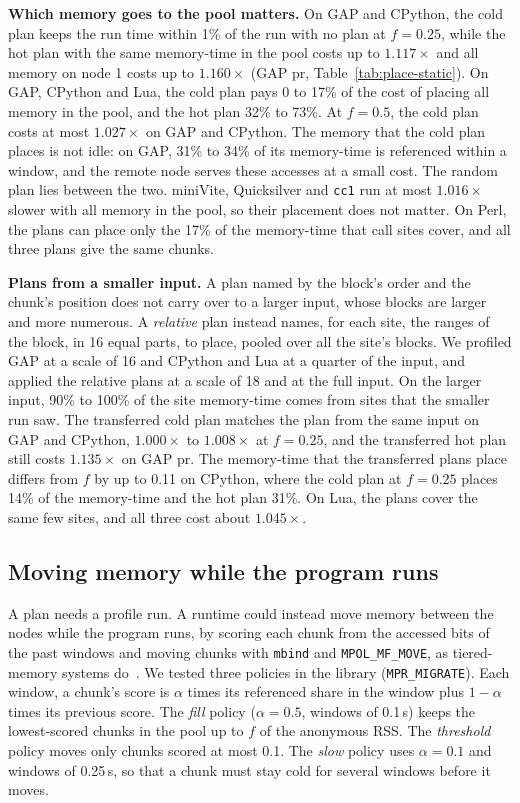 \documentclass[11pt]{article}
\newcommand{\tabref}[1]{Table~\ref{#1}}
\newcommand{\term}[1]{\emph{#1}}
\begin{document}
\textbf{Which memory goes to the pool matters.} On GAP and CPython, the cold plan keeps the run time within 1\% of
the run with no plan at $f = 0.25$, while the hot plan with the same memory-time in the pool costs up to
$1.117\times$ and all memory on node 1 costs up to $1.160\times$ (GAP pr, \tabref{tab:place-static}). On GAP, CPython
and Lua, the cold plan pays 0 to 17\% of the cost of placing all memory in the pool, and the hot plan 32\% to 73\%.
At $f = 0.5$, the cold plan costs at most $1.027\times$ on GAP and CPython. The memory that the cold plan places is
not idle: on GAP, 31\% to 34\% of its memory-time is referenced within a window, and the remote node serves these
accesses at a small cost. The random plan lies between the two. miniVite, Quicksilver and \texttt{cc1} run at most $1.016\times$ slower
with all memory in the pool, so their placement does not matter. On Perl, the plans can place only the 17\% of the
memory-time that call sites cover, and all three plans give the same chunks.

\textbf{Plans from a smaller input.} A plan named by the block's order and the chunk's position does not carry over
to a larger input, whose blocks are larger and more numerous. A \term{relative} plan instead names, for each site, the
ranges of the block, in 16 equal parts, to place, pooled over all the site's blocks. We profiled GAP at a scale of 16
and CPython and Lua at a quarter of the input, and applied the relative plans at a scale of 18 and at the full input.
On the larger input, 90\% to 100\% of the site memory-time comes from sites that the smaller run saw. The transferred
cold plan matches the plan from the same input on GAP and CPython, $1.000\times$ to $1.008\times$ at $f = 0.25$, and the
transferred hot plan still costs $1.135\times$ on GAP pr. The memory-time that the transferred plans place differs
from $f$ by up to 0.11 on CPython, where the cold plan at $f = 0.25$ places 14\% of the memory-time and the hot plan
31\%. On Lua, the plans cover the same few sites, and all three cost about $1.045\times$.

\subsection{Moving memory while the program runs}

A plan needs a profile run. A runtime could instead move memory between the nodes while the program runs, by scoring
each chunk from the accessed bits of the past windows and moving chunks with \texttt{mbind} and
\texttt{MPOL\_MF\_MOVE}, as tiered-memory systems do~\cite{Maruf2023TPP,Raybuck2021HeMem,Lee2023Memtis}. We tested
three policies in the library (\texttt{MPR\_MIGRATE}). Each window, a chunk's score is $\alpha$ times its referenced
share in the window plus $1 - \alpha$ times its previous score. The \term{fill} policy ($\alpha = 0.5$, windows of
0.1\,s) keeps the lowest-scored chunks in the pool up to $f$ of the anonymous RSS. The \term{threshold} policy moves
only chunks scored at most 0.1. The \term{slow} policy uses $\alpha = 0.1$ and windows of 0.25\,s, so that a chunk must
stay cold for several windows before it moves.
\end{document}
